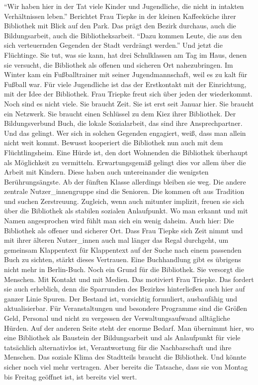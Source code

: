 \documentclass[a4paper,
fontsize=11pt,
oneside,
numbers=noperiodatend,
parskip=half-,
bibliography=totoc,
final
]{scrartcl}
\begin{document}
\enquote{Wir haben hier in der Tat viele Kinder und Jugendliche, die
nicht in intakten Verhältnissen leben.} Berichtet Frau Tiepke in der
kleinen Kaffeeküche ihrer Bibliothek mit Blick auf den Park. Das prägt
den Bezirk durchaus, auch die Bildungsarbeit, auch die
Bibliotheksarbeit. \enquote{Dazu kommen Leute, die aus den sich
verteuernden Gegenden der Stadt verdrängt werden.} Und jetzt die
Flüchtinge. Sie tut, was sie kann, hat drei Schulklassen am Tag im Haus,
denen sie versucht, die Bibliothek als offenen und sicheren Ort
nahezubringen. Im Winter kam ein Fußballtrainer mit seiner
Jugendmannschaft, weil es zu kalt für Fußball war. Für viele Jugendliche
ist das der Erstkontakt mit der Einrichtung, mit der Idee der
Bibliothek. Frau Triepke freut sich über jeden der wiederkommt. Noch
sind es nicht viele. Sie braucht Zeit. Sie ist erst seit Januar hier.
Sie braucht ein Netzwerk. Sie braucht einen Schlüssel zu dem Kiez ihrer
Bibliothek. Der Bildungsverbund Buch, die lokale Sozialarbeit, das sind
ihre Ansprechpartner. Und das gelingt. Wer sich in solchen Gegenden
engagiert, weiß, dass man allein nicht weit kommt. Bewusst kooperiert
die Bibliothek nun auch mit dem Flüchtlingsheim. Eine Hürde ist, den
dort Wohnenden die Bibliothek überhaupt als Möglichkeit zu vermitteln.
Erwartungsgemäß gelingt dies vor allem über die Arbeit mit Kindern.
Diese haben auch untereinander die wenigsten Berührungsängste. Ab der
fünften Klasse allerdings bleiben sie weg. Die andere zentrale
Nutzer\_innengruppe sind die Senioren. Die kommen oft aus Tradition und
suchen Zerstreuung. Zugleich, wenn auch mitunter implizit, freuen sie
sich über die Bibliothek als stabilen sozialen Anlaufpunkt. Wo man
erkannt und mit Namen angesprochen wird fühlt man sich ein wenig daheim.
Auch hier: Die Bibliothek als offener und sicherer Ort. Dass Frau Tiepke
sich Zeit nimmt und mit ihrer älteren Nutzer\_innen auch mal länger das
Regal durchgeht, um gemeinsam Klappentext für Klappentext auf der Suche
nach einem passenden Buch zu sichten, stärkt dieses Vertrauen. Eine
Buchhandlung gibt es übrigens nicht mehr in Berlin-Buch. Noch ein Grund
für die Bibliothek. Sie versorgt die Menschen. Mit Kontakt und mit
Medien. Das motiviert Frau Triepke. Das fordert sie auch erheblich, denn
die Sparrunden des Bezirkes hinterließen auch hier auf ganzer Linie
Spuren. Der Bestand ist, vorsichtig formuliert, ausbaufähig und
aktualisierbar. Für Veranstaltungen und besondere Programme sind die
Größen Geld, Personal und nicht zu vergessen der Verwaltungsaufwand
alltägliche Hürden. Auf der anderen Seite steht der enorme Bedarf. Man
übernimmt hier, wo eine Bibliothek als Baustein der Bildungsarbeit und
als Anlaufpunkt für viele tatsächlich alternativlos ist, Verantwortung
für die Nachbarschaft und ihre Menschen. Das soziale Klima des
Stadtteils braucht die Bibliothek. Und könnte sicher noch viel mehr
vertragen. Aber bereits die Tatsache, dass sie von Montag bis Freitag
geöffnet ist, ist bereits viel wert.
\end{document}
